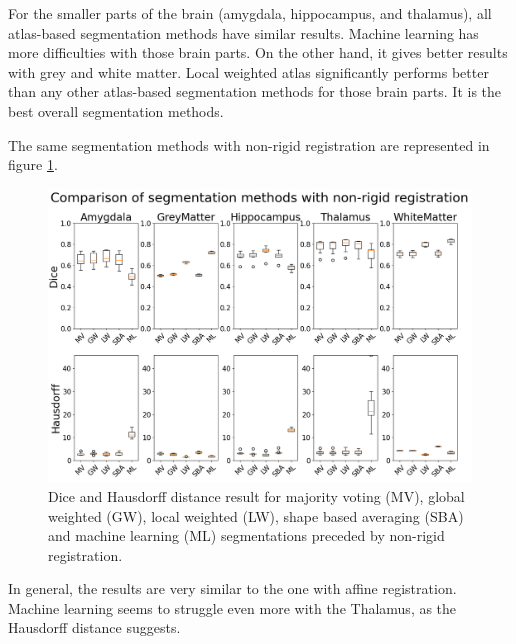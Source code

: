 For the smaller parts of the brain (amygdala, hippocampus, and thalamus), all atlas-based segmentation methods have similar results. Machine learning has more difficulties with those brain parts. On the other hand, it gives better results with grey and white matter. Local weighted atlas significantly performs better than any other atlas-based segmentation methods for those brain parts. It is the best overall segmentation methods.

The same segmentation methods with non-rigid registration are represented in figure \ref{fig:boxplotNR}.

\begin{figure}[h!]
	\centering
	\includegraphics[width = .48 \textwidth]{img/boxplot_NR_all}
	\caption{Dice and Hausdorff distance result for majority voting (MV), global weighted (GW), local weighted (LW), shape based averaging (SBA) and machine learning (ML) segmentations preceded by non-rigid registration.}
	\label{fig:boxplotNR}
\end{figure}

In general, the results are very similar to the one with affine registration. Machine learning seems to struggle even more with the Thalamus, as the Hausdorff distance suggests.
